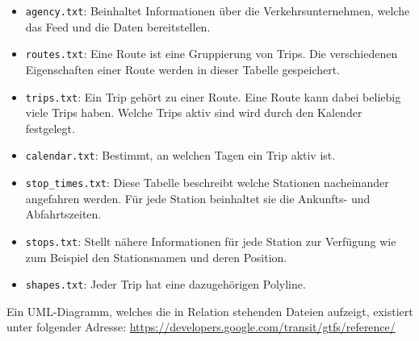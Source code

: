 \begin{newpage}
		\begin{itemize}
			\item \texttt{agency.txt}: Beinhaltet Informationen über die Verkehrsunternehmen, welche das Feed und die Daten bereitstellen.

			\item \texttt{routes.txt}: Eine Route ist eine Gruppierung von Trips. Die verschiedenen Eigenschaften einer Route werden in dieser Tabelle gespeichert.

			\item \texttt{trips.txt}: Ein Trip gehört zu einer Route. Eine Route kann dabei beliebig viele Trips haben. Welche Trips aktiv sind wird durch den Kalender festgelegt.

			\item \texttt{calendar.txt}: Bestimmt, an welchen Tagen ein Trip aktiv ist.

			\item \texttt{stop\_times.txt}: Diese Tabelle beschreibt welche Stationen nacheinander angefahren werden. Für jede Station beinhaltet sie die Ankunfts- und Abfahrtszeiten.

			\item \texttt{stops.txt}: Stellt nähere Informationen für jede Station zur Verfügung wie zum Beispiel den Stationsnamen und deren Position.

			\item \texttt{shapes.txt}: Jeder Trip hat eine dazugehörigen Polyline.

		\end{itemize}

  Ein UML-Diagramm, welches die in Relation stehenden Dateien aufzeigt, existiert unter folgender Adresse: \url{https://developers.google.com/transit/gtfs/reference/} 

\end{newpage}

